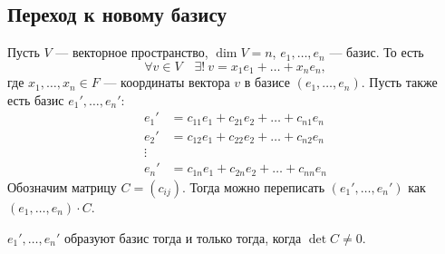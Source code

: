 \subsection{Переход к новому базису}
Пусть $V$ --- векторное пространство, $\dim V = n$, $e_1, \ldots, e_n$ --- базис. То есть
\[
\forall v \in V \quad \exists!\: v = x_1e_1 + \ldots + x_ne_n,
\]
где $x_1, \ldots, x_n \in F$ --- координаты вектора $v$ в базисе $\left(e_1, \ldots, e_n\right)$. 
Пусть также есть базис $e_1', \ldots, e_n'$:
\begin{align*}
    e_1' &= c_{11}e_1 + c_{21}e_2 + \ldots + c_{n1}e_n\\
    e_2' &= c_{12}e_1 + c_{22}e_2 + \ldots + c_{n2}e_n\\
    \vdots\\
    e_n' &= c_{1n}e_1 + c_{2n}e_2 + \ldots + c_{nn}e_n
\end{align*}
Обозначим матрицу $C = \left(c_{ij}\right)$. Тогда можно переписать $\left(e_1', \ldots, e_n'\right)$ как $\left(e_1, \ldots, e_n\right)\cdot C$.
\begin{Suggestion}
$e_1', \ldots, e_n'$ образуют базис тогда и только тогда, когда $\det C \neq 0$.
\end{Suggestion}

